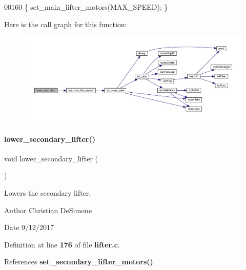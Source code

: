 \begin{DoxyCode}
00160 \{ set_main_lifter_motors(MAX\_SPEED); \}
\end{DoxyCode}
Here is the call graph for this function\+:
\nopagebreak
\begin{figure}[H]
\begin{center}
\leavevmode
\includegraphics[width=350pt]{lifter_8h_ad36c37086a91046af4e6f619618b7719_cgraph}
\end{center}
\end{figure}
\mbox{\label{lifter_8h_af76abbd394bf206ab56fa237d776f2b3}} 
\paragraph{lower\+\_\+secondary\+\_\+lifter()}
{\footnotesize\ttfamily void lower\+\_\+secondary\+\_\+lifter (\begin{DoxyParamCaption}{ }\end{DoxyParamCaption})}



Lowers the secondary lifter. 

\begin{DoxyAuthor}{Author}
Christian De\+Simone 
\end{DoxyAuthor}
\begin{DoxyDate}{Date}
9/12/2017 
\end{DoxyDate}


Definition at line \textbf{ 176} of file \textbf{ lifter.\+c}.



References \textbf{ set\+\_\+secondary\+\_\+lifter\+\_\+motors()}.


